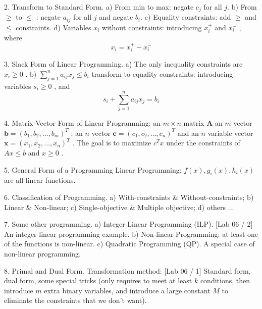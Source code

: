 \documentclass[10pt,a4paper]{article}
\begin{document}
2. Transform to Standard Form.
a) From min to max: negate \(c_{j}\) for all \(j\).
b) From \(\geq\) to \(\leq\) : negate \(a_{ij}\) for all \(j\) and negate \(b_{i}\).
c) Equality constraints: add \(\geq\) and \(\leq\) constraints.
d) Variables \(x_{i}\) without constraints: introducing \(x_{i}^{+}\) and \(x_{i}^{-}\) , where
\[
x_{i} = x_{i}^{+} - x_{i}^{-}
\]

3. Slack Form of Linear Programming.
a) The only inequality constraints are \(x_{i}\geq 0\) .
b) \(\sum_{j = 1}^{n}a_{ij}x_{j}\leq b_{i}\) transform to equality constraints: introducing variables \(s_{i}\geq 0\) , and
\[
s_i + \sum_{j = 1}^{n}a_{ij}x_j = b_i
\]

4. Matrix-Vector Form of Linear Programming: an \(m\times n\) matrix \(\pmb{A}\) an \(m\) vector \(\pmb {b} = (b_{1},b_{2},\dots,b_{m})^{T}\) ; an \(n\) vector \(\pmb {c} = (c_{1},c_{2},\dots,c_{n})^{T}\) and an \(n\) variable vector \(\pmb {x} = (x_{1},x_{2},\dots,x_{n})^{T}\) . The goal is to maximize \(c^{T}x\) under the constraints of \(A x\leq b\) and \(x\geq 0\) .

5. General Form of a Programming
Linear Programming: \(f(x),g_{i}(x),h_{i}(x)\) are all linear functions.

6. Classification of Programming.
a) With-constraints \& Without-constraints;
b) Linear \& Non-linear;
c) Single-objective \& Multiple objective;
d) others ...

7. Some other programming.
a) Integer Linear Programming (ILP).
[Lab 06 / 2] An integer linear programming example.
b) Non-linear Programming: at least one of the functions is non-linear.
c) Quadratic Programming (QP). A special case of non-linear programming.

8. Primal and Dual Form. Transformation method:
[Lab 06 / 1] Standard form, dual form, some special tricks (only requires to meet at least \(k\) conditions, then introduce \(m\) extra binary variables, and introduce a large constant \(M\) to eliminate the constraints that we don't want).
\end{document}
